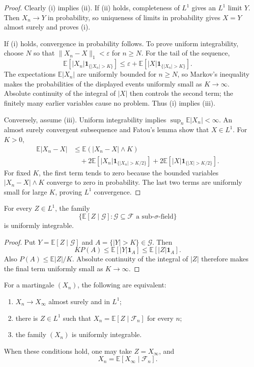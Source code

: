 \begin{proof}
Clearly (i) implies (ii). If (ii) holds, completeness of $L^1$ gives an
$L^1$ limit $Y$. Then $X_n\to Y$ in probability, so uniqueness of limits in
probability gives $X=Y$ almost surely and proves (i).

If (i) holds, convergence in probability follows. To prove uniform
integrability, choose $N$ so that
$\|X_n-X\|_1<\varepsilon$ for $n\geq N$. For the tail of the sequence,
\[
\mathbb E[|X_n|\mathbf1_{\{|X_n|>K\}}]
 \leq\varepsilon+
 \mathbb E[|X|\mathbf1_{\{|X_n|>K\}}].
\]
The expectations $\mathbb E|X_n|$ are uniformly bounded for $n\geq N$, so
Markov's inequality makes the probabilities of the displayed events uniformly
small as $K\to\infty$. Absolute continuity of the integral of $|X|$ then
controls the second term; the finitely many earlier variables cause no
problem. Thus (i) implies (iii).

Conversely, assume (iii). Uniform integrability implies
$\sup_n\mathbb E|X_n|<\infty$. An almost surely convergent subsequence and
Fatou's lemma show that $X\in L^1$. For $K>0$,
\begin{align*}
\mathbb E|X_n-X|
&\leq \mathbb E(|X_n-X|\wedge K)\\
&\quad+2\mathbb E[|X_n|\mathbf1_{\{|X_n|>K/2\}}]
     +2\mathbb E[|X|\mathbf1_{\{|X|>K/2\}}].
\end{align*}
For fixed $K$, the first term tends to zero because the bounded variables
$|X_n-X|\wedge K$ converge to zero in probability. The last two terms are
uniformly small for large $K$, proving $L^1$ convergence.
\end{proof}

\begin{lem}
For every $Z\in L^1$, the family
\[
\{\mathbb E[Z\mid\mathcal G]:\mathcal G\subseteq\mathcal F
  \text{ a sub-$\sigma$-field}\}
\]
is uniformly integrable.
\end{lem}

\begin{proof}
Put $Y=\mathbb E[Z\mid\mathcal G]$ and
$A=\{|Y|>K\}\in\mathcal G$. Then
\[
K P(A)\leq\mathbb E[|Y|\mathbf1_A]
 \leq\mathbb E[|Z|\mathbf1_A].
\]
Also $P(A)\leq\mathbb E|Z|/K$. Absolute continuity of the integral of $|Z|$
therefore makes the final term uniformly small as $K\to\infty$.
\end{proof}

\begin{thm}
For a martingale $(X_n)$, the following are equivalent:
\begin{enumerate}[label=(\roman*)]
  \item $X_n\to X_\infty$ almost surely and in $L^1$;
  \item there is $Z\in L^1$ such that
  $X_n=\mathbb E[Z\mid\mathcal F_n]$ for every $n$;
  \item the family $(X_n)$ is uniformly integrable.
\end{enumerate}
When these conditions hold, one may take $Z=X_\infty$, and
\[
X_n=\mathbb E[X_\infty\mid\mathcal F_n].
\]
\end{thm}

